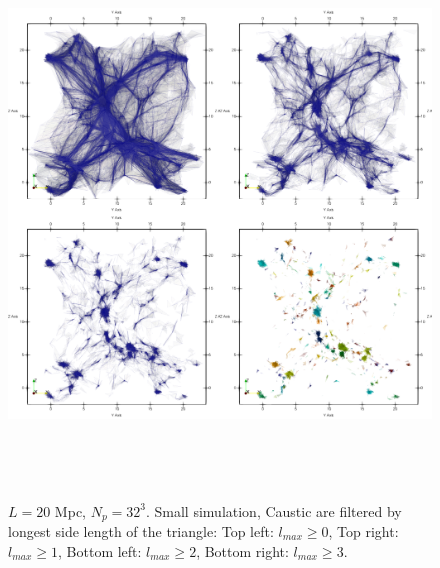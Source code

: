 \begin{figure} 
\centering\includegraphics[height=15cm]{Chapter2/Plots/caustic_connectivity.png} 
\caption{$L=20$ Mpc, $N_p = 32^3$. Small simulation, Caustic are filtered by longest side length of the triangle: Top left: $ l_{max} \geq 0$, Top right: $ l_{max} \geq 1$, Bottom left: $ l_{max} \geq 2$, Bottom right: $ l_{max} \geq 3$. }
\label{fig:caustic_lmax}
\end{figure}


